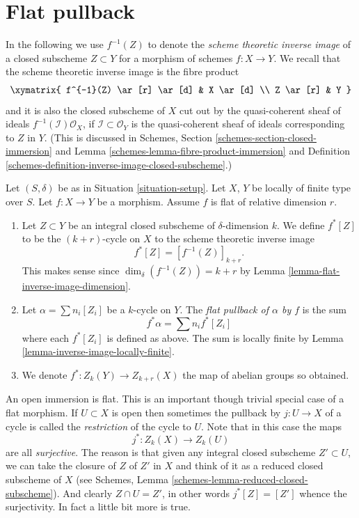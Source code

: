 \section{Flat pullback}
\label{section-flat-pullback}

\noindent
In the following we use $f^{-1}(Z)$ to denote the
{\it scheme theoretic inverse image} of a closed subscheme
$Z \subset Y$ for a morphism of schemes $f : X \to Y$.
We recall that the scheme theoretic inverse image is the fibre product
$$
\xymatrix{
f^{-1}(Z) \ar[r] \ar[d] & X \ar[d] \\
Z \ar[r] & Y
}
$$
and it is also the closed subscheme of $X$ cut out by the
quasi-coherent sheaf of ideals $f^{-1}(\mathcal{I})\mathcal{O}_X$, if
$\mathcal{I} \subset \mathcal{O}_Y$ is the quasi-coherent sheaf of ideals
corresponding to $Z$ in $Y$.
(This is discussed in
Schemes, Section \ref{schemes-section-closed-immersion} and
Lemma \ref{schemes-lemma-fibre-product-immersion}
and Definition \ref{schemes-definition-inverse-image-closed-subscheme}.)

\begin{definition}
\label{definition-flat-pullback}
Let $(S, \delta)$ be as in Situation \ref{situation-setup}.
Let $X$, $Y$ be locally of finite type over $S$.
Let $f : X \to Y$ be a morphism.
Assume $f$ is flat of relative dimension $r$.
\begin{enumerate}
\item Let $Z \subset Y$ be an integral closed subscheme of
$\delta$-dimension $k$. We define $f^*[Z]$ to be the
$(k+r)$-cycle on $X$ to the scheme theoretic inverse image
$$
f^*[Z] = [f^{-1}(Z)]_{k+r}.
$$
This makes sense since $\dim_\delta(f^{-1}(Z)) = k + r$
by Lemma \ref{lemma-flat-inverse-image-dimension}.
\item Let $\alpha = \sum n_i [Z_i]$ be
a $k$-cycle on $Y$. The {\it flat pullback of $\alpha$ by $f$}
is the sum
$$
f^* \alpha = \sum n_i f^*[Z_i]
$$
where each $f^*[Z_i]$ is defined as above.
The sum is locally finite by Lemma \ref{lemma-inverse-image-locally-finite}.
\item We denote $f^* : Z_k(Y) \to Z_{k + r}(X)$ the map of abelian
groups so obtained.
\end{enumerate}
\end{definition}

\noindent
An open immersion is flat. This is an important though trivial special
case of a flat morphism. If $U \subset X$ is open then sometimes the
pullback by $j : U \to X$ of a cycle is called the {\it restriction} of the
cycle to $U$. Note that in this case the maps
$$
j^* : Z_k(X) \longrightarrow Z_k(U)
$$
are all {\it surjective}. The reason is that given any integral closed
subscheme $Z' \subset U$, we can take the closure of $Z$ of $Z'$ in $X$
and think of it as a reduced closed subscheme of $X$ (see
Schemes, Lemma \ref{schemes-lemma-reduced-closed-subscheme}).
And clearly $Z \cap U = Z'$, in other words
$j^*[Z] = [Z']$ whence the surjectivity. In fact a little bit more
is true.

